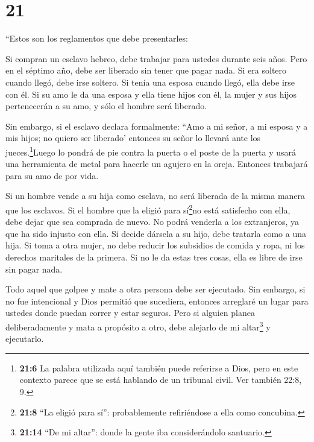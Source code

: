 \hypertarget{section-20}{%
\section{21}\label{section-20}}

 ``Estos son los reglamentos que debe presentarles:

 Si compran un esclavo hebreo, debe trabajar para ustedes
durante seis años. Pero en el séptimo año, debe ser liberado sin tener
que pagar nada.  Si era soltero cuando llegó, debe irse
soltero. Si tenía una esposa cuando llegó, ella debe irse con él.
 Si su amo le da una esposa y ella tiene hijos con él, la
mujer y sus hijos pertenecerán a su amo, y sólo el hombre será liberado.

 Sin embargo, si el esclavo declara formalmente: ``Amo a mi
señor, a mi esposa y a mis hijos; no quiero ser liberado' 
entonces su señor lo llevará ante los jueces.\footnote{\textbf{21:6} La
  palabra utilizada aquí también puede referirse a Dios, pero en este
  contexto parece que se está hablando de un tribunal civil. Ver también
  22:8, 9.}Luego lo pondrá de pie contra la puerta o el poste de la
puerta y usará una herramienta de metal para hacerle un agujero en la
oreja. Entonces trabajará para su amo de por vida.

 Si un hombre vende a su hija como esclava, no será liberada
de la misma manera que los esclavos.  Si el hombre que la
eligió para sí\footnote{\textbf{21:8} ``La eligió para sí'':
  probablemente refiriéndose a ella como concubina.}no está satisfecho
con ella, debe dejar que sea comprada de nuevo. No podrá venderla a los
extranjeros, ya que ha sido injusto con ella.  Si decide
dársela a su hijo, debe tratarla como a una hija.  Si toma
a otra mujer, no debe reducir los subsidios de comida y ropa, ni los
derechos maritales de la primera.  Si no le da estas tres
cosas, ella es libre de irse sin pagar nada.

 Todo aquel que golpee y mate a otra persona debe ser
ejecutado.  Sin embargo, si no fue intencional y Dios
permitió que sucediera, entonces arreglaré un lugar para ustedes donde
puedan correr y estar seguros.  Pero si alguien planea
deliberadamente y mata a propósito a otro, debe alejarlo de mi
altar\footnote{\textbf{21:14} ``De mi altar'': donde la gente iba
  considerándolo santuario.} y ejecutarlo.

